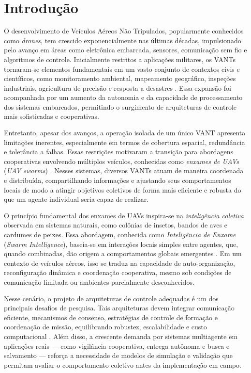 \documentclass[portuguese]{sbcreviews-2025}%
\begin{document}
\section{Introdução}
\label{sec:intro}

O desenvolvimento de Veículos Aéreos Não Tripulados, popularmente conhecidos como \textit{drones}, tem crescido exponencialmente nas últimas décadas, impulsionado pelo avanço em áreas como eletrônica embarcada, sensores, comunicação sem fio e algoritmos de controle. Inicialmente restritos a aplicações militares, os VANTs tornaram-se elementos fundamentais em um vasto conjunto de contextos civis e científicos, como monitoramento ambiental, mapeamento geográfico, inspeções industriais, agricultura de precisão e resposta a desastres \cite{chung2018survey, hong2020swarm}. Essa expansão foi acompanhada por um aumento da autonomia e da capacidade de processamento dos sistemas embarcados, permitindo o surgimento de arquiteturas de controle mais sofisticadas e cooperativas.

Entretanto, apesar dos avanços, a operação isolada de um único VANT apresenta limitações inerentes, especialmente em termos de cobertura espacial, redundância e tolerância a falhas. Essas restrições motivaram a transição para abordagens cooperativas envolvendo múltiplos veículos, conhecidas como \textit{enxames de UAVs} (\textit{UAV swarms}) \cite{bu2024advancement}. Nesses sistemas, diversos VANTs atuam de maneira coordenada e distribuída, compartilhando informações e ajustando seus comportamentos locais de modo a atingir objetivos coletivos de forma mais eficiente e robusta do que um agente individual seria capaz de realizar.

O princípio fundamental dos enxames de UAVs inspira-se na \textit{inteligência coletiva} observada em sistemas naturais, como colônias de insetos, bandos de aves e cardumes de peixes. Essa abordagem, conhecida como \textit{Inteligência de Enxame} (\textit{Swarm Intelligence}), baseia-se em interações locais simples entre agentes, que, quando combinadas, dão origem a comportamentos globais emergentes \cite{ren2007consensus, chung2018survey}. Em um contexto de veículos aéreos, isso se traduz na capacidade de auto-organização, reconfiguração dinâmica e coordenação cooperativa, mesmo sob condições de comunicação limitada ou ambientes parcialmente desconhecidos.

Nesse cenário, o projeto de arquiteturas de controle adequadas é um dos principais desafios de pesquisa. Tais arquiteturas devem integrar comunicação eficiente, mecanismos de consenso, estratégias de controle de formação e coordenação de missão, equilibrando robustez, escalabilidade e custo computacional \cite{ouyang2023formation, bu2024advancement}. Além disso, a crescente demanda por sistemas multiagente em aplicações reais — como vigilância cooperativa, entrega autônoma e busca e salvamento — reforça a necessidade de modelos de simulação e validação que permitam avaliar o comportamento coletivo antes da implementação em campo.
\end{document}
